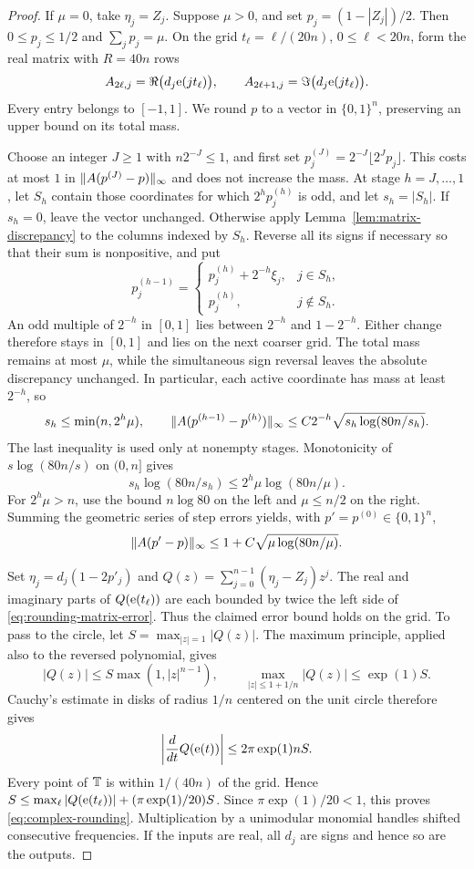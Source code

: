\begin{proof}
If $\mu=0$, take $\eta_j=Z_j$.  Suppose $\mu>0$, and set
$p_j=(1-|Z_j|)/2$.  Then $0\le p_j\le1/2$ and $\sum_jp_j=\mu$.
On the grid $t_\ell=\ell/(20n)$, $0\le\ell<20n$, form the real matrix
with $R=40n$ rows
\[
 A_{2\ell,j}=\Re\bigl(d_j\mathrm e(jt_\ell)\bigr),\qquad
 A_{2\ell+1,j}=\Im\bigl(d_j\mathrm e(jt_\ell)\bigr).
\]
Every entry belongs to $[-1,1]$.  We round $p$ to a vector in
$\{0,1\}^n$, preserving an upper bound on its total mass.

Choose an integer $J\ge1$ with $n2^{-J}\le1$, and first set
$p_j^{(J)}=2^{-J}\lfloor2^Jp_j\rfloor$.  This costs at most $1$ in
$\lVert A(p^{(J)}-p)\rVert_\infty$ and does not increase the mass.
At stage $h=J,\ldots,1$, let $S_h$ contain those coordinates for which
$2^hp_j^{(h)}$ is odd, and let $s_h=|S_h|$.  If $s_h=0$, leave the
vector unchanged.  Otherwise apply Lemma~\ref{lem:matrix-discrepancy}
to the columns indexed by $S_h$.  Reverse all its signs if necessary so
that their sum is nonpositive, and put
\[
 p_j^{(h-1)}=
 \begin{cases}
 p_j^{(h)}+2^{-h}\xi_j,&j\in S_h,\\
 p_j^{(h)},&j\notin S_h.
 \end{cases}
\]
An odd multiple of $2^{-h}$ in $[0,1]$ lies between $2^{-h}$ and
$1-2^{-h}$.  Either change therefore stays in $[0,1]$ and lies on the
next coarser grid.  The total mass remains at most $\mu$, while the
simultaneous sign reversal leaves the absolute discrepancy unchanged.
In particular, each active coordinate has mass at least $2^{-h}$, so
\[
 s_h\le\min(n,2^h\mu),\qquad
 \lVert A(p^{(h-1)}-p^{(h)})\rVert_\infty
 \le C2^{-h}\sqrt{s_h\log(80n/s_h)}.
\]
The last inequality is used only at nonempty stages.  Monotonicity of
$s\log(80n/s)$ on $(0,n]$ gives
\[
 s_h\log(80n/s_h)\le2^h\mu\log(80n/\mu).
\]
For $2^h\mu>n$, use the bound $n\log80$ on the left and
$\mu\le n/2$ on the right.  Summing the geometric series of step errors
yields, with $p'=p^{(0)}\in\{0,1\}^n$,
\begin{equation}\label{eq:rounding-matrix-error}
 \lVert A(p'-p)\rVert_\infty
 \le1+C\sqrt{\mu\log(80n/\mu)}.
\end{equation}

Set $\eta_j=d_j(1-2p'_j)$ and
$Q(z)=\sum_{j=0}^{n-1}(\eta_j-Z_j)z^j$.
The real and imaginary parts of $Q(\mathrm e(t_\ell))$ are each bounded by
twice the left side of \eqref{eq:rounding-matrix-error}.  Thus the
claimed error bound holds on the grid.
To pass to the circle, let $S=\max_{|z|=1}|Q(z)|$.  The maximum principle,
applied also to the reversed polynomial, gives
\[
 |Q(z)|\le S\max(1,|z|^{n-1}),\qquad
 \max_{|z|\le1+1/n}|Q(z)|\le\exp(1)S.
\]
Cauchy's estimate in disks of radius $1/n$ centered on the unit circle
therefore gives
\[
 \left|\frac{d}{dt}Q(\mathrm e(t))\right|\le2\pi\exp(1)nS.
\]
Every point of $\mathbb T$ is within $1/(40n)$ of the grid.  Hence
$S\le\max_\ell|Q(\mathrm e(t_\ell))|+(\pi\exp(1)/20)S$.
Since $\pi\exp(1)/20<1$, this proves
\eqref{eq:complex-rounding}.  Multiplication by a unimodular monomial
handles shifted consecutive frequencies.  If the inputs are real,
all $d_j$ are signs and hence so are the outputs.
\end{proof}
